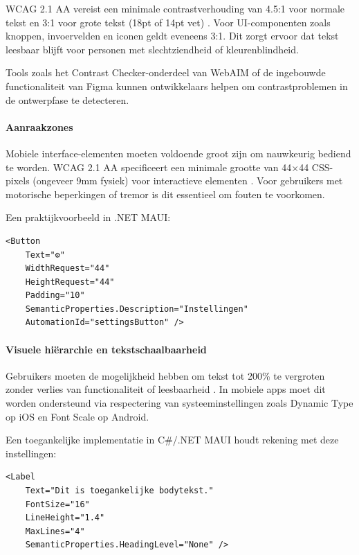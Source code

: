 WCAG 2.1 AA vereist een minimale contrastverhouding van 4.5:1 voor normale tekst en 3:1 voor grote tekst (18pt of 14pt vet) \autocite{W3CWCAG21}. Voor UI-componenten zoals knoppen, invoervelden en iconen geldt eveneens 3:1. Dit zorgt ervoor dat tekst leesbaar blijft voor personen met slechtziendheid of kleurenblindheid.

Tools zoals het Contrast Checker-onderdeel van WebAIM of de ingebouwde functionaliteit van Figma kunnen ontwikkelaars helpen om contrastproblemen in de ontwerpfase te detecteren.

\paragraph{Aanraakzones}

Mobiele interface-elementen moeten voldoende groot zijn om nauwkeurig bediend te worden. WCAG 2.1 AA specificeert een minimale grootte van 44×44 CSS-pixels (ongeveer 9mm fysiek) voor interactieve elementen \autocite{W3CWCAG21}. Voor gebruikers met motorische beperkingen of tremor is dit essentieel om fouten te voorkomen.

Een praktijkvoorbeeld in .NET MAUI:

\begin{listing}[H]
\begin{verbatim}
<Button
    Text="⚙"
    WidthRequest="44"
    HeightRequest="44"
    Padding="10"
    SemanticProperties.Description="Instellingen"
    AutomationId="settingsButton" />
\end{verbatim}
\caption{Een icoonknop met voldoende aanraakzone (44×44 pixels) voor motorische toegankelijkheid.}
\label{lst:touch-target}
\end{listing}

\paragraph{Visuele hiërarchie en tekstschaalbaarheid}

Gebruikers moeten de mogelijkheid hebben om tekst tot 200\% te vergroten zonder verlies van functionaliteit of leesbaarheid \autocite{W3CWCAG21}. In mobiele apps moet dit worden ondersteund via respectering van systeeminstellingen zoals Dynamic Type op iOS en Font Scale op Android.

Een toegankelijke implementatie in C\#/.NET MAUI houdt rekening met deze instellingen:

\begin{listing}[H]
\begin{verbatim}
<Label
    Text="Dit is toegankelijke bodytekst."
    FontSize="16"
    LineHeight="1.4"
    MaxLines="4"
    SemanticProperties.HeadingLevel="None" />
\end{verbatim}
\caption{Toegankelijke tekstweergave in .NET MAUI met leesbare regelhoogte en semantische metadata.}
\label{lst:font-scaling}
\end{listing}


